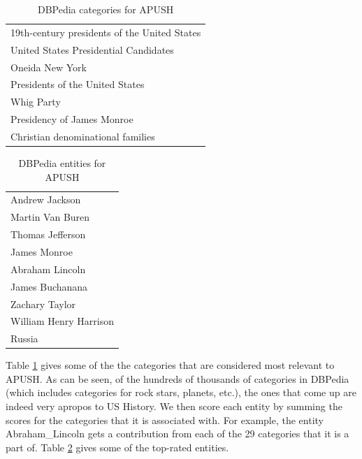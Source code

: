 \documentclass[pdfpagelabels=false,plainpages=true]{acm_proc_article-sp}
\begin{document}
\begin{table}
\begin{center}
\begin{tabular}{|l|} \hline
19th-century presidents of the United States \\
United States Presidential Candidates \\
Oneida New York \\
Presidents of the United States \\
Whig Party \\
Presidency of James Monroe \\
Christian denominational families \\
\hline \end{tabular}
\caption{DBPedia categories for APUSH}
\label{tab-categories}
\end{center}
\end{table}

\begin{table}
\begin{center}
\begin{tabular}{|l|} \hline
Andrew Jackson \\
Martin Van Buren \\
Thomas Jefferson \\
James Monroe \\
Abraham Lincoln \\
James Buchanana \\
Zachary Taylor \\
William Henry Harrison \\
Russia \\
\hline\end{tabular}
\caption{DBPedia entities for APUSH}
\label{tab-entities}
\end{center}
\end{table}

Table \ref{tab-categories} gives some of the the categories that are considered
most relevant to APUSH. As can be seen, of the hundreds of thousands of categories in
DBPedia (which includes categories for rock stars, planets, etc.), the
ones that come up are indeed very apropos to US History.           
We then score each entity by summing the scores for the categories that it is
associated with. For example, the entity Abraham\_Lincoln gets a contribution
from each of the 29 categories that it is a part of. Table \ref{tab-entities}
gives some of the top-rated entities. 
\end{document}

